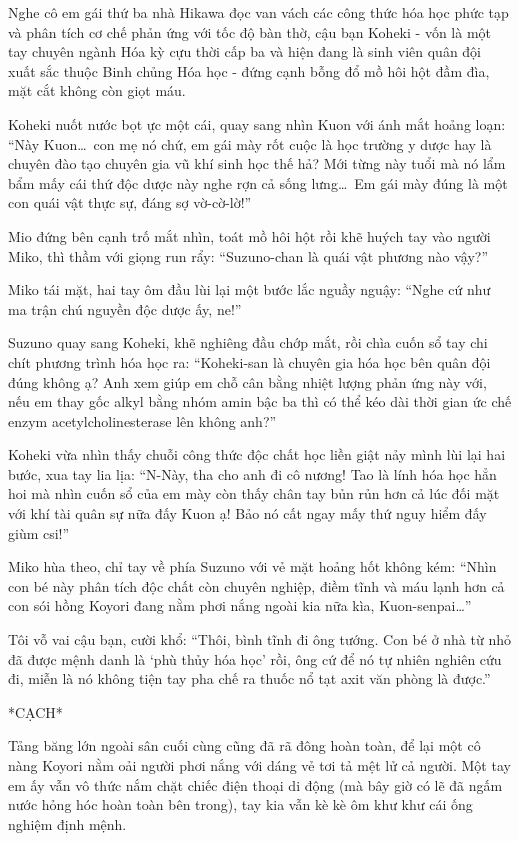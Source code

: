 \documentclass[../main.tex]{subfiles}
\begin{document}
Nghe cô em gái thứ ba nhà Hikawa đọc van vách các công thức hóa học phức tạp và phân tích cơ chế phản ứng với tốc độ bàn thờ, cậu bạn Koheki - vốn là một tay chuyên ngành Hóa kỳ cựu thời cấp ba và hiện đang là sinh viên quân đội xuất sắc thuộc Binh chủng Hóa học - đứng cạnh bỗng đổ mồ hôi hột đầm đìa, mặt cắt không còn giọt máu.

Koheki nuốt nước bọt ực một cái, quay sang nhìn Kuon với ánh mắt hoảng loạn: ``Này Kuon\dots\ con mẹ nó chứ, em gái mày rốt cuộc là học trường y dược hay là chuyên đào tạo chuyên gia vũ khí sinh học thế hả? Mới từng này tuổi mà nó lẩm bẩm mấy cái thứ độc dược này nghe rợn cả sống lưng\dots\ Em gái mày đúng là một con quái vật thực sự, đáng sợ vờ-cờ-lờ!''

Mio đứng bên cạnh trố mắt nhìn, toát mồ hôi hột rồi khẽ huých tay vào người Miko, thì thầm với giọng run rẩy: ``Suzuno-chan là quái vật phương nào vậy?''

Miko tái mặt, hai tay ôm đầu lùi lại một bước lắc nguầy nguậy: ``Nghe cứ như ma trận chú nguyền độc dược ấy, ne!''

Suzuno quay sang Koheki, khẽ nghiêng đầu chớp mắt, rồi chìa cuốn sổ tay chi chít phương trình hóa học ra: ``Koheki-san là chuyên gia hóa học bên quân đội đúng không ạ? Anh xem giúp em chỗ cân bằng nhiệt lượng phản ứng này với, nếu em thay gốc alkyl bằng nhóm amin bậc ba thì có thể kéo dài thời gian ức chế enzym acetylcholinesterase lên không anh?''

Koheki vừa nhìn thấy chuỗi công thức độc chất học liền giật nảy mình lùi lại hai bước, xua tay lia lịa: ``N-Này, tha cho anh đi cô nương! Tao là lính hóa học hẳn hoi mà nhìn cuốn sổ của em mày còn thấy chân tay bủn rủn hơn cả lúc đối mặt với khí tài quân sự nữa đấy Kuon ạ! Bảo nó cất ngay mấy thứ nguy hiểm đấy giùm csi!''

Miko hùa theo, chỉ tay về phía Suzuno với vẻ mặt hoảng hốt không kém: ``Nhìn con bé này phân tích độc chất còn chuyên nghiệp, điềm tĩnh và máu lạnh hơn cả con sói hồng Koyori đang nằm phơi nắng ngoài kia nữa kìa, Kuon-senpai\dots''

Tôi vỗ vai cậu bạn, cười khổ: ``Thôi, bình tĩnh đi ông tướng. Con bé ở nhà từ nhỏ đã được mệnh danh là `phù thủy hóa học' rồi, ông cứ để nó tự nhiên nghiên cứu đi, miễn là nó không tiện tay pha chế ra thuốc nổ tạt axit văn phòng là được.''

*CẠCH*

Tảng băng lớn ngoài sân cuối cùng cũng đã rã đông hoàn toàn, để lại một cô nàng Koyori nằm oải người phơi nắng với dáng vẻ tơi tả mệt lử cả người. Một tay em ấy vẫn vô thức nắm chặt chiếc điện thoại di động (mà bây giờ có lẽ đã ngấm nước hỏng hóc hoàn toàn bên trong), tay kia vẫn kè kè ôm khư khư cái ống nghiệm định mệnh.
\end{document}
